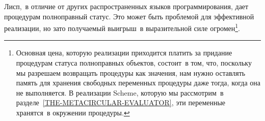 Лисп,~в отличие от
других распространенных языков программирования, дает
процедурам полноправный статус.  Это может быть проблемой для
эффективной реализации, но зато получаемый выигрыш~в выразительной
силе огромен\footnote{Основная цена, которую реализации приходится платить
за придание процедурам статуса полноправных объектов, состоит~в том,
что, поскольку мы разрешаем возвращать процедуры как значения, нам
нужно оставлять память для хранения свободных переменных процедуры
даже тогда, когда она не выполняется. В реализации Scheme, которую мы 
рассмотрим~в разделе~\ref{THE-METACIRCULAR-EVALUATOR}, эти
переменные хранятся~в окружении процедуры.}.

